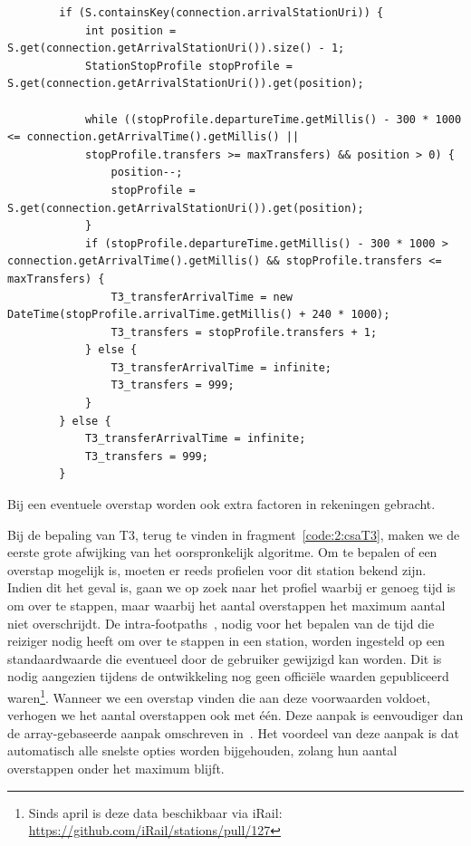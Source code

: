 \begin{listing}[htb]
	\begin{verbatim}
		if (S.containsKey(connection.arrivalStationUri)) {
			int position = S.get(connection.getArrivalStationUri()).size() - 1;
			StationStopProfile stopProfile = S.get(connection.getArrivalStationUri()).get(position);
			
			while ((stopProfile.departureTime.getMillis() - 300 * 1000 <= connection.getArrivalTime().getMillis() ||
			stopProfile.transfers >= maxTransfers) && position > 0) {
				position--;
				stopProfile = S.get(connection.getArrivalStationUri()).get(position);
			}
			if (stopProfile.departureTime.getMillis() - 300 * 1000 > connection.getArrivalTime().getMillis() && stopProfile.transfers <= maxTransfers) {
				T3_transferArrivalTime = new DateTime(stopProfile.arrivalTime.getMillis() + 240 * 1000);
				T3_transfers = stopProfile.transfers + 1;
			} else {
				T3_transferArrivalTime = infinite;
				T3_transfers = 999;
			}
		} else {
			T3_transferArrivalTime = infinite;
			T3_transfers = 999;
		}
		\end{verbatim}
		\caption[CSA: Bepalen van aankomsttijden]{Bij een eventuele overstap worden ook extra factoren in rekeningen gebracht.}
		\label{code:2:csaT3}
\end{listing}

Bij de bepaling van T3, terug te vinden in fragment~\ref{code:2:csaT3}, maken we de eerste grote afwijking van het oorspronkelijk algoritme. Om te bepalen of een overstap mogelijk is, moeten er reeds profielen voor dit station bekend zijn. Indien dit het geval is, gaan we op zoek naar het profiel waarbij er genoeg tijd is om over te stappen, maar waarbij het aantal overstappen het maximum aantal niet overschrijdt. 
De intra-footpaths~\citep{strasser17,hannemann08}, nodig voor het bepalen van de tijd die reiziger nodig heeft om over te stappen in een station, worden ingesteld op een standaardwaarde die eventueel door de gebruiker gewijzigd kan worden. Dit is nodig aangezien tijdens de ontwikkeling nog geen officiële waarden gepubliceerd waren\footnote{Sinds april is deze data beschikbaar via iRail: \url{https://github.com/iRail/stations/pull/127}}. 
Wanneer we een overstap vinden die aan deze voorwaarden voldoet, verhogen we het aantal overstappen ook met één. Deze aanpak is eenvoudiger dan de array-gebaseerde aanpak omschreven in~\cite{strasser17}. Het voordeel van deze aanpak is dat automatisch alle snelste opties worden bijgehouden, zolang hun aantal overstappen onder het maximum blijft. 

